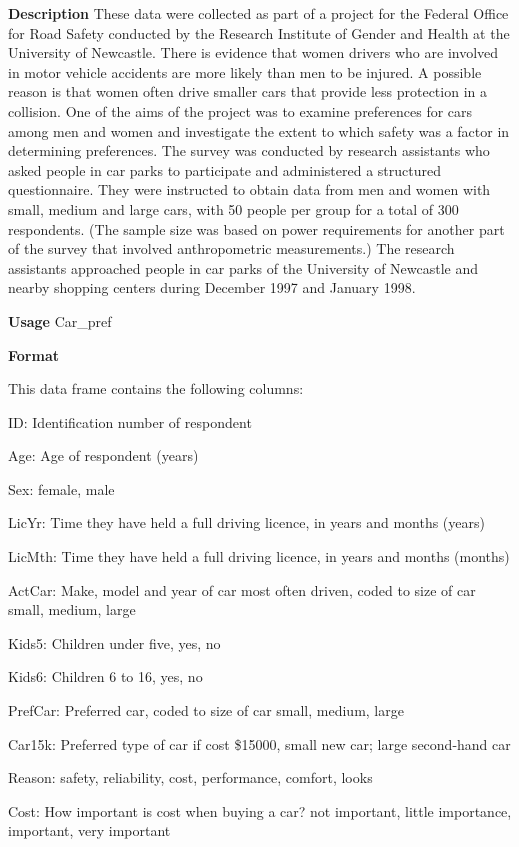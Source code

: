 \documentclass[
]{book}
\begin{document}
\textbf{Description}
These data were collected as part of a project for the Federal Office for Road Safety conducted by the Research Institute of Gender and Health at the University of Newcastle. There is evidence that women drivers who are involved in motor vehicle accidents are more likely than men to be injured. A possible reason is that women often drive smaller cars that provide less protection in a collision. One of the aims of the project was to examine preferences for cars among men and women and investigate the extent to which safety was a factor in determining preferences. The survey was conducted by research assistants who asked people in car parks to participate and administered a structured questionnaire. They were instructed to obtain data from men and women with small, medium and large cars, with 50 people per group for a total of 300 respondents. (The sample size was based on power requirements for another part of the survey that involved anthropometric measurements.) The research assistants approached people in car parks of the University of Newcastle and nearby shopping centers during December 1997 and January 1998.

\textbf{Usage}
Car\_pref

\textbf{Format}

This data frame contains the following columns:

ID: Identification number of respondent

Age: Age of respondent (years)

Sex: female, male

LicYr: Time they have held a full driving licence, in years and months (years)

LicMth: Time they have held a full driving licence, in years and months (months)

ActCar: Make, model and year of car most often driven, coded to size of car small, medium, large

Kids5: Children under five, yes, no

Kids6: Children 6 to 16, yes, no

PrefCar: Preferred car, coded to size of car small, medium, large

Car15k: Preferred type of car if cost \$15000, small new car; large second-hand car

Reason: safety, reliability, cost, performance, comfort, looks

Cost: How important is cost when buying a car? not important, little importance, important, very important
\end{document}
